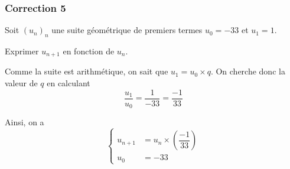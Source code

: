 \documentclass[15pt, mathserif]{beamer}
\begin{document}
\begin{frame}
\vspace{-10mm}
	\frametitle{Correction 5}
Soit $(u_n)_n$ une suite géométrique de premiers termes $u_0=-33$ et $u_1=1$. 
 
 Exprimer $u_{n+1}$ en fonction de $u_n$. 
 
 \vspace*{1cm} 
 
 Comme la suite est arithmétique, on sait que $u_1=u_0\times q$. On cherche donc la valeur de $q$ en calculant $$\dfrac{u_1}{u_0}=\dfrac{1}{-33}=\dfrac{-1}{33}$$ 
 
 Ainsi, on a $$ \left\{ 
 \begin{array}{ll} 
 u_{n+1} &= u_n \times \left( \dfrac{-1}{33} \right)  \\ 
 u_0 & = -33 
 \end{array} 
 \right. $$ 
 \end{frame}
\end{document}
